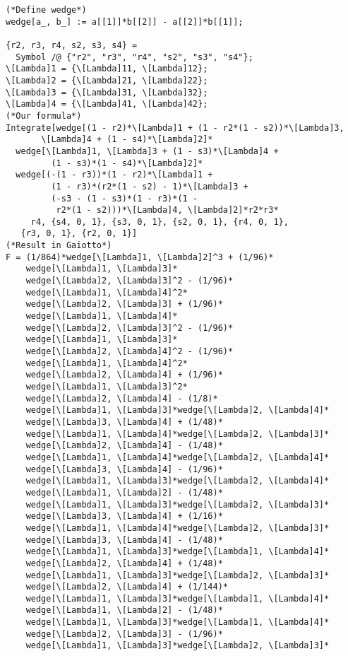 \documentclass[11pt]{amsart}
\theoremstyle{definition}
\theoremstyle{remark}
\numberwithin{equation}{section}
\begin{document}
\fi
\begin{lstlisting}
(*Define wedge*)
wedge[a_, b_] := a[[1]]*b[[2]] - a[[2]]*b[[1]];

{r2, r3, r4, s2, s3, s4} =
  Symbol /@ {"r2", "r3", "r4", "s2", "s3", "s4"};
\[Lambda]1 = {\[Lambda]11, \[Lambda]12};
\[Lambda]2 = {\[Lambda]21, \[Lambda]22};
\[Lambda]3 = {\[Lambda]31, \[Lambda]32};
\[Lambda]4 = {\[Lambda]41, \[Lambda]42};
(*Our formula*)
Integrate[wedge[(1 - r2)*\[Lambda]1 + (1 - r2*(1 - s2))*\[Lambda]3,
       \[Lambda]4 + (1 - s4)*\[Lambda]2]*
  wedge[\[Lambda]1, \[Lambda]3 + (1 - s3)*\[Lambda]4 +
         (1 - s3)*(1 - s4)*\[Lambda]2]*
  wedge[(-(1 - r3))*(1 - r2)*\[Lambda]1 +
         (1 - r3)*(r2*(1 - s2) - 1)*\[Lambda]3 +
         (-s3 - (1 - s3)*(1 - r3)*(1 -
          r2*(1 - s2)))*\[Lambda]4, \[Lambda]2]*r2*r3*
     r4, {s4, 0, 1}, {s3, 0, 1}, {s2, 0, 1}, {r4, 0, 1},
   {r3, 0, 1}, {r2, 0, 1}]
(*Result in Gaiotto*)
F = (1/864)*wedge[\[Lambda]1, \[Lambda]2]^3 + (1/96)*
    wedge[\[Lambda]1, \[Lambda]3]*
    wedge[\[Lambda]2, \[Lambda]3]^2 - (1/96)*
    wedge[\[Lambda]1, \[Lambda]4]^2*
    wedge[\[Lambda]2, \[Lambda]3] + (1/96)*
    wedge[\[Lambda]1, \[Lambda]4]*
    wedge[\[Lambda]2, \[Lambda]3]^2 - (1/96)*
    wedge[\[Lambda]1, \[Lambda]3]*
    wedge[\[Lambda]2, \[Lambda]4]^2 - (1/96)*
    wedge[\[Lambda]1, \[Lambda]4]^2*
    wedge[\[Lambda]2, \[Lambda]4] + (1/96)*
    wedge[\[Lambda]1, \[Lambda]3]^2*
    wedge[\[Lambda]2, \[Lambda]4] - (1/8)*
    wedge[\[Lambda]1, \[Lambda]3]*wedge[\[Lambda]2, \[Lambda]4]*
    wedge[\[Lambda]3, \[Lambda]4] + (1/48)*
    wedge[\[Lambda]1, \[Lambda]4]*wedge[\[Lambda]2, \[Lambda]3]*
    wedge[\[Lambda]2, \[Lambda]4] - (1/48)*
    wedge[\[Lambda]1, \[Lambda]4]*wedge[\[Lambda]2, \[Lambda]4]*
    wedge[\[Lambda]3, \[Lambda]4] - (1/96)*
    wedge[\[Lambda]1, \[Lambda]3]*wedge[\[Lambda]2, \[Lambda]4]*
    wedge[\[Lambda]1, \[Lambda]2] - (1/48)*
    wedge[\[Lambda]1, \[Lambda]3]*wedge[\[Lambda]2, \[Lambda]3]*
    wedge[\[Lambda]3, \[Lambda]4] + (1/16)*
    wedge[\[Lambda]1, \[Lambda]4]*wedge[\[Lambda]2, \[Lambda]3]*
    wedge[\[Lambda]3, \[Lambda]4] - (1/48)*
    wedge[\[Lambda]1, \[Lambda]3]*wedge[\[Lambda]1, \[Lambda]4]*
    wedge[\[Lambda]2, \[Lambda]4] + (1/48)*
    wedge[\[Lambda]1, \[Lambda]3]*wedge[\[Lambda]2, \[Lambda]3]*
    wedge[\[Lambda]2, \[Lambda]4] + (1/144)*
    wedge[\[Lambda]1, \[Lambda]3]*wedge[\[Lambda]1, \[Lambda]4]*
    wedge[\[Lambda]1, \[Lambda]2] - (1/48)*
    wedge[\[Lambda]1, \[Lambda]3]*wedge[\[Lambda]1, \[Lambda]4]*
    wedge[\[Lambda]2, \[Lambda]3] - (1/96)*
    wedge[\[Lambda]1, \[Lambda]3]*wedge[\[Lambda]2, \[Lambda]3]*

\end{lstlisting}
\end{document}
